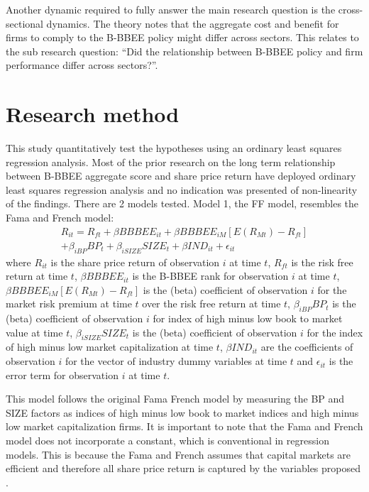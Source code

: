 Another dynamic required to fully answer the main research question is the cross-sectional dynamics. The theory notes that the aggregate cost and benefit for firms to comply to the B-BBEE policy might differ across sectors. This relates to the sub research question: “Did the relationship between B-BBEE policy and firm performance differ across sectors?”.
\section{Research method}
This study quantitatively test the hypotheses using an ordinary least squares regression analysis. Most of the prior research on the long term relationship between B-BBEE aggregate score and share price return have deployed ordinary least squares regression analysis and no indication was presented of non-linearity of the findings. There are 2 models tested. Model 1, the FF model, resembles the Fama and French model:
\begin{equation}
\begin{aligned} %
    R_{it} = R_{ft} + \beta BBBEE_{it} + \beta BBBEE_{iM}[E(R_{Mt}) - R_{ft}] \\
    + \beta_{iBP} BP_t + \beta_{iSIZE} SIZE_t +  \beta IND_{it} + \epsilon_{it}
\end{aligned}
\end{equation}
where $R_{it}$ is the share price return of observation $i$ at time $t$, $R_{ft}$ is the risk free return at time $t$, $\beta BBBEE_{it}$ is the B-BBEE rank for observation $i$ at time $t$, $\beta BBBEE_{iM}[E(R_{Mt}) - R_{ft}]$ is the (beta) coefficient of observation $i$ for the market risk premium at time $t$ over the risk free return at time $t$, $\beta_{iBP} BP_t$ is the (beta) coefficient of observation $i$  for index of high minus low book to market value at time $t$, $\beta_{iSIZE} SIZE_t$ is the (beta) coefficient of observation $i$  for the index of high minus low market capitalization at time $t$, $\beta IND_{it}$ are the coefficients of observation $i$ for the vector of industry dummy variables at time $t$ and $\epsilon_{it}$ is the error term for observation $i$ at time $t$. 

This model follows the original Fama French model by measuring the BP and SIZE factors as indices of high minus low book to market indices and high minus low market capitalization firms. It is important to note that the Fama and French model does not incorporate a constant, which is conventional in regression models. This is because the Fama and French assumes that capital markets are efficient and therefore all share price return is captured by the variables proposed \cite[]{N64}. 


